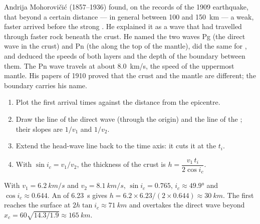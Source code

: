 \begin{history}
Andrija Mohorovičić (1857--1936) found, on the records of the 1909
earthquake, that beyond a certain distance --- in general between 100 and
\qty{150}{km} --- a weak, faster  arrived before the strong .
He explained it as a wave that had travelled through faster rock beneath the
crust. He named the two waves Pg (the direct wave in the crust) and Pn (the
 along the top of the mantle), did the same for , and
deduced the speeds of both layers and the depth of the boundary between them.
The Pn wave travels at about \qty{8.0}{km/s}, the speed of the uppermost
mantle. His papers of 1910 proved that the crust and the mantle are
different; the boundary carries his name.
\end{history}

\begin{method}\label{met:g11:seismic-structure:moho}
\begin{enumerate}
  \item Plot the first arrival times against the distance from the
        epicentre.
  \item Draw the line of the direct wave (through the origin) and the line
        of the ; their slopes are $1/v_1$ and $1/v_2$.
  \item Extend the head-wave line back to the time axis: it cuts it at the
         $t_i$.
  \item With $\sin i_c = v_1/v_2$, the thickness of the crust is
        $h = \dfrac{v_1\,t_i}{2\cos i_c}$.
\end{enumerate}
\end{method}

\begin{example}\label{ex:g11:seismic-structure:moho}
With $v_1 = \qty{6.2}{km/s}$ and $v_2 = \qty{8.1}{km/s}$, $\sin i_c = 0.765$,
$i_c \approx \ang{49.9}$ and $\cos i_c \approx 0.644$. An  of
\qty{6.23}{s} gives $h = 6.2 \times 6.23/(2 \times 0.644) \approx
\qty{30}{km}$. The  first reaches the surface at
$2h\tan i_c \approx \qty{71}{km}$ and overtakes the direct wave beyond
$x_c = 60\sqrt{14.3/1.9} \approx \qty{165}{km}$.
\end{example}

